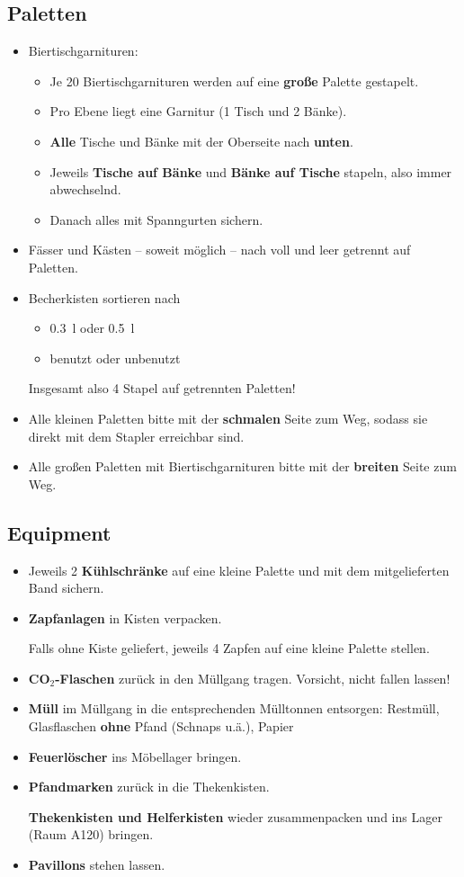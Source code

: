 \subsection{Paletten}
\begin{itemize}
  \item Biertischgarnituren:
    \begin{itemize}
      \item Je 20 Biertischgarnituren werden auf eine \textbf{große} Palette gestapelt.
      \item Pro Ebene liegt eine Garnitur (1 Tisch und 2 Bänke).
      \item \textbf{Alle} Tische und Bänke mit der Oberseite nach \textbf{unten}.
      \item Jeweils \textbf{Tische auf Bänke} und \textbf{Bänke auf Tische} stapeln, also immer abwechselnd.
      \item Danach alles mit Spanngurten sichern. %
    \end{itemize}
  \item Fässer und Kästen -- soweit möglich -- nach voll und leer getrennt auf Paletten.
  \item Becherkisten sortieren nach
    \begin{itemize}
      \item \SI{0.3}{\litre} oder \SI{0.5}{\litre}
      \item benutzt oder unbenutzt
    \end{itemize}
    Insgesamt also 4 Stapel auf getrennten Paletten!
  \item Alle kleinen Paletten bitte mit der \textbf{schmalen} Seite zum Weg, sodass sie direkt mit dem Stapler erreichbar sind.
  \item Alle großen Paletten mit Biertischgarnituren bitte mit der \textbf{breiten} Seite zum Weg.
\end{itemize}
\subsection{Equipment}
\begin{itemize}
  \item Jeweils 2 \textbf{Kühlschränke} auf eine kleine Palette und mit dem mitgelieferten Band sichern.
  \item \textbf{Zapfanlagen} in Kisten verpacken.
    
    Falls ohne Kiste geliefert, jeweils 4 Zapfen auf eine kleine Palette stellen.
  \item \textbf{CO$_2$-Flaschen} zurück in den Müllgang tragen. Vorsicht, nicht fallen lassen!
  \item \textbf{Müll} im Müllgang in die entsprechenden Mülltonnen entsorgen: Restmüll, Glasflaschen \textbf{ohne} Pfand (Schnaps u.ä.), Papier
  \item \textbf{Feuerlöscher} ins Möbellager bringen.
  \item \textbf{Pfandmarken} zurück in die Thekenkisten.
    
    \textbf{Thekenkisten und Helferkisten} wieder zusammenpacken und ins Lager (Raum A120) bringen. %
  \item \textbf{Pavillons} stehen lassen.
\end{itemize}
